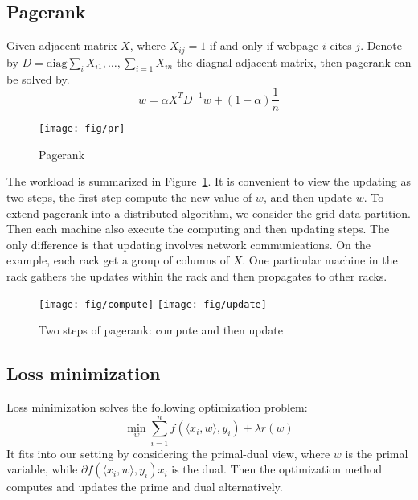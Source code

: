\documentclass{acm_proc_article-sp}
\begin{document}
\subsection{Pagerank}
\label{sec:pagerank}

Given adjacent matrix $X$, where $X_{ij} = 1 $ if and only if webpage $i$ cites
$j$. Denote by $D=\textrm{diag}{\sum_i X_{i1}, \ldots, \sum_{i=1} X_{in}}$ the diagnal
adjacent matrix, then pagerank can be solved by.
\begin{equation}
  w = \alpha X^T D^{-1} w + (1-\alpha)\frac{1}{n}
\end{equation}

\begin{figure}[th!]
  \centering
  \texttt{[image: fig/pr]}
  \caption{Pagerank}
  \label{fig:pr}
\end{figure}

The workload is summarized in Figure~\ref{fig:pr}. It is convenient to view the
updating as two steps, the
first step compute the new value of $w$, and then update $w$. To extend pagerank
into a distributed algorithm, we consider the grid data partition. Then each
machine also execute the computing and then updating steps. The only difference
is that updating involves network communications. On the example, each rack get
a group of columns of $X$. One particular  machine in the rack gathers the
updates within the rack and then propagates to other racks.

\begin{figure}[th!]
  \centering
  \texttt{[image: fig/compute]}
  \texttt{[image: fig/update]}
  \caption{Two steps of pagerank: compute and then update}
\end{figure}

\subsection{Loss minimization}

Loss minimization solves the following optimization problem:
\begin{equation}
  \min_w \sum_{i=1}^{n} f(\langle x_i, w\rangle, y_i) + \lambda r(w)
\end{equation}
It fits into our setting by considering the primal-dual view, where $w$ is the primal
variable, while $\partial f(\langle x_i, w\rangle, y_i) x_i$ is the dual. Then
the optimization method computes and updates the prime and dual alternatively.
\end{document}
